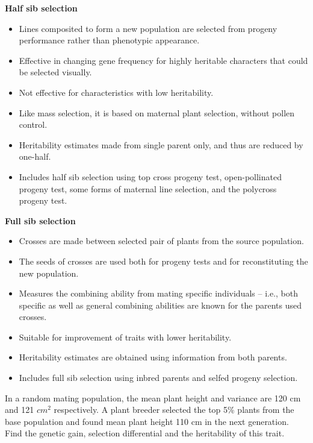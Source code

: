 \documentclass[
  answers,addpoints,12pt]{exam}
\providecommand{\tightlist}{%
  \setlength{\itemsep}{0pt}\setlength{\parskip}{0pt}}
\newcommand{\bsolution}{\begin{solution}}
\newcommand{\esolution}{\end{solution}}
\begin{document}
\bsolution

\textbf{Half sib selection}

\begin{itemize}
\tightlist
\item
  Lines composited to form a new population are selected from progeny performance rather than phenotypic appearance.
\item
  Effective in changing gene frequency for highly heritable characters that could be selected visually.
\item
  Not effective for characteristics with low heritability.
\item
  Like mass selection, it is based on maternal plant selection, without pollen control.
\item
  Heritability estimates made from single parent only, and thus are reduced by one-half.
\item
  Includes half sib selection using top cross progeny test, open-pollinated progeny test, some forms of maternal line selection, and the polycross progeny test.
\end{itemize}

\textbf{Full sib selection}

\begin{itemize}
\tightlist
\item
  Crosses are made between selected pair of plants from the source population.
\item
  The seeds of crosses are used both for progeny tests and for reconstituting the new population.
\item
  Measures the combining ability from mating specific individuals -- i.e., both specific as well as general combining abilities are known for the parents used crosses.
\item
  Suitable for improvement of traits with lower heritability.
\item
  Heritability estimates are obtained using information from both parents.
\item
  Includes full sib selection using inbred parents and selfed progeny selection.
\end{itemize}

\esolution

\question[4] \label{quest:third}

In a random mating population, the mean plant height and variance are 120 cm and 121 \(cm^2\) respectively. A plant breeder selected the top 5\% plants from the base population and found mean plant height 110 cm in the next generation. Find the genetic gain, selection differential and the heritability of this trait.
\end{document}

